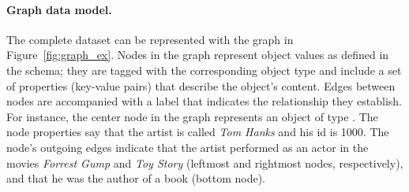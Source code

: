 
\paragraph{Graph data model.}

The complete \goodbois dataset can be represented with the graph in
Figure~\ref{fig:graph_ex}. Nodes in the graph represent object values
as defined in the schema; they are tagged with the corresponding
object type and include a set of properties (key-value pairs) that
describe the object's content. Edges between nodes are accompanied with
a label that indicates the relationship they establish. For instance,
the center node in the graph represents an object of type
\artist. The node properties say that the artist is called {\em Tom Hanks} and his id is 1000.
The node's outgoing edges indicate that the artist 
performed as an actor in the movies \emph{Forrest Gump} and \emph{Toy Story}
(leftmost and rightmost nodes, respectively), and
that he was the author of a book (bottom node).








